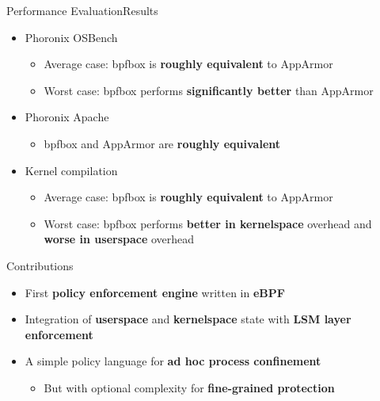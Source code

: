 \documentclass[12pt, dvipsnames]{beamer}
\begin{document}
\begin{frame}[c]{Performance Evaluation}{Results}
\begin{itemize}
    \item Phoronix OSBench
    \begin{itemize}
        \item Average case: bpfbox is \textbf{roughly equivalent} to AppArmor
        \item Worst case: bpfbox performs \textbf{significantly better} than AppArmor
    \end{itemize}

    \vfill
    \item Phoronix Apache
    \begin{itemize}
        \item bpfbox and AppArmor are \textbf{roughly equivalent}
    \end{itemize}

    \vfill
    \item Kernel compilation
    \begin{itemize}
        \item Average case: bpfbox is \textbf{roughly equivalent} to AppArmor
        \item Worst case: bpfbox performs \textbf{better in kernelspace} overhead and \textbf{worse in userspace} overhead
    \end{itemize}
\end{itemize}
\end{frame}


\begin{frame}[c]{Contributions}
\begin{itemize}
    \item First \textbf{policy enforcement engine} written in \textbf{eBPF}
    \vfill
    \item Integration of \textbf{userspace} and \textbf{kernelspace} state with \textbf{LSM layer enforcement}
    \vfill
    \item A simple policy language for \textbf{ad hoc process confinement}
    \begin{itemize}
        \item But with optional complexity for \textbf{fine-grained protection}
    \end{itemize}
\end{itemize}
\end{frame}
\end{document}
